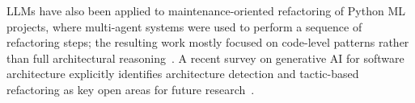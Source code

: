 LLMs have also been applied to maintenance-oriented refactoring of Python ML projects, where multi-agent systems were used to perform a sequence of refactoring steps; the resulting work mostly focused on code-level patterns rather than full architectural reasoning~\cite{pucho2025refactoring}. A recent survey on generative AI for software architecture explicitly identifies architecture detection and tactic-based refactoring as key open areas for future research~\cite{esposito2025generative}.